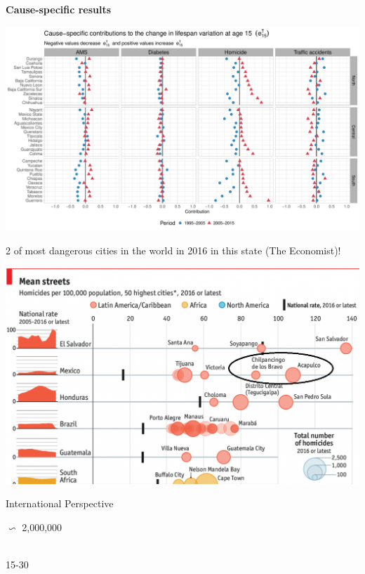 \documentclass[xcolor={dvipsnames}]{beamer}
\begin{document}
\begin{frame}
\begin{center}
\Large{\textbf{Cause-specific results}}
\end{center}

\hspace*{-1cm}   
\includegraphics[scale=.38]{Figures/Figure_4}

\end{frame}


\begin{frame}

\Large{
2 of most dangerous cities in the world in 2016 in this state (The Economist)!

				\begin{center}
		\includegraphics[scale=.38]{Figures/Capture}
				\end{center}				

}
\end{frame}


\begin{frame}
\Huge{
\begin{center}
International Perspective \linebreak \\

{\fontsize{70}{80}\selectfont 

 $\backsim$ 2,000,000}\\
15-30

\end{center}
}
\end{frame}
\end{document}
